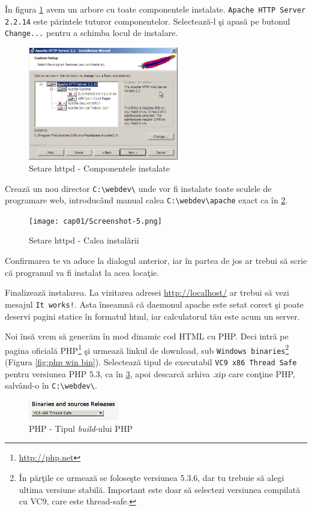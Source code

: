 În figura \ref{fig:httpd components tree} avem un arbore cu toate componentele instalate. \texttt{Apache HTTP Server 2.2.14}
este părintele tuturor componentelor. Selectează-l şi apasă pe butonul
\texttt{Change...} pentru a schimba locul de instalare.

\begin{figure}[ht!]
  \centering
    \includegraphics[width=248px]{cap01/Screenshot-4.png}
  \caption{Setare httpd - Componentele instalate}
  \label{fig:httpd components tree}
\end{figure}

Crează un nou director \texttt{C:{\textbackslash}webdev\textbackslash}
unde vor fi instalate toate sculele
de programare web, introducând manual calea \texttt{C:{\textbackslash}webdev{\textbackslash}apache}
exact ca în \ref{fig:httpd custom path}.

\begin{figure}[ht!]
  \centering
    \texttt{[image: cap01/Screenshot-5.png]}
  \caption{Setare httpd - Calea instalării}
  \label{fig:httpd custom path}
\end{figure}

Confirmarea te va aduce la dialogul anterior, iar în partea de jos ar trebui să scrie
că programul va fi instalat la acea locaţie.

Finalizează instalarea. La vizitarea adresei \url{http://localhost/} ar trebui să
vezi mesajul \texttt{It works!}. Asta înseamnă că daemonul apache este setat corect şi poate deservi
pagini statice în formatul html, iar calculatorul tău este acum un server.

Noi însă vrem să generăm în mod dinamic cod HTML cu PHP. Deci intră pe pagina oficială
PHP\footnote{\url{http://php.net}} şi urmează linkul de download,
sub \texttt{Windows binaries}\footnote{În părţile ce urmează se foloseşte
versiunea 5.3.6, dar tu trebuie să alegi ultima versiune stabilă. Important este 
doar să selectezi versiunea compilată cu VC9, care este thread-safe.} (Figura \ref{fig:php win bin}).
Selectează tipul de executabil \texttt{VC9 x86 Thread Safe} pentru
versiunea PHP 5.3, ca în \ref{fig:php build type}, apoi
descarcă arhiva .zip care conţine PHP, salvând-o în \texttt{C:{\textbackslash}webdev\textbackslash}.
\begin{figure}[ht!]
  \centering
    \includegraphics[width=150px]{cap01/Screenshot-7.png}
  \caption{PHP - Tipul \textsl{build}-ului PHP}
  \label{fig:php build type}
\end{figure}


